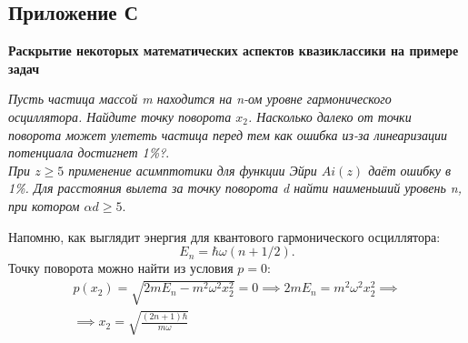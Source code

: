 \setcounter{figure}{0} 
\begin{center}
    \section{Приложение С}\label{appendix:C}
    \textbf{\Large{Раскрытие некоторых математических аспектов квазиклассики на примере задач}}
\end{center}

\begin{center}
\textit{Пусть частица массой m находится на n-ом уровне гармонического осциллятора. Найдите точку поворота $x_2$. Насколько далеко от точки поворота может улететь частица перед тем как ошибка из-за линеаризации потенциала достигнет 1\%?}.\\
\textit{При $z\geq 5$ применение асимптотики для функции Эйри $Ai(z)$ даёт ошибку в 1\%. Для расстояния вылета за точку поворота d найти наименьший уровень n, при котором $\alpha d\geq 5$}.
\end{center}

Напомню, как выглядит энергия для квантового гармонического осциллятора: 
\[E_n = \hbar\omega(n + 1/2).\] 
Точку поворота можно найти из условия $p = 0$:
\begin{gather*} 
p(x_2) = \sqrt{2mE_n - m^2\omega^2x_2^2} = 0 \implies 2mE_n = m^2\omega^2x_2^2 \implies \\
\implies x_2 = \sqrt{\frac{(2n + 1)\hbar}{m\omega}}
\end{gather*}

